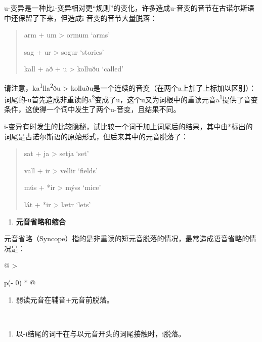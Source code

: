 u-变异是一种比i-变异相对更``规则''的变化，许多造成u-音变的音节在古诺尔斯语中还保留了下来，但造成i-音变的音节大量脱落：

\begin{quote}
arm + um \textgreater{} ormum `arms'

sag + ur \textgreater{} sogur `stories'

kall + að + u \textgreater{} kolluðu `called'
\end{quote}

请注意，ka\textsuperscript{1}lla\textsuperscript{2}ðu \textgreater{}
kolluðu是一个连续的音变（在两个a上加了上标加以区别）：词尾的-u首先造成非重读的a\textsuperscript{2}变成了u，这个u又为词根中的重读元音a\textsuperscript{1}提供了音变条件，这使得一个词中发生了两个u-音变，且结果不同。

i-变异有时发生的比较隐秘，试比较一个词干加上词尾后的结果，其中由*标出的词尾是古诺尔斯语的原始形式，但后来其中的元音脱落了：

\begin{quote}
sat + ja \textgreater{} setja `set'

vall + ir \textgreater{} vellir `fields'

mús + *ir \textgreater{} mýss `mice'

lát + *ir \textgreater{} lætr `lets'
\end{quote}

\begin{enumerate}
\def\labelenumi{\Alph{enumi}.}
\setcounter{enumi}{1}
\item
  \label{_Ref115693879}{}\textbf{元音省略和缩合}
\end{enumerate}

元音省略（Syncope）指的是非重读的短元音脱落的情况，最常造成语音省略的情况是：

\begin{longtable}[]{@{}
  >{\raggedright\arraybackslash}p{(\columnwidth - 0\tabcolsep) * }@{}}
\toprule\noalign{}
\begin{minipage}[b]{\linewidth}\raggedright
\begin{enumerate}
\def\labelenumi{\arabic{enumi}.}
\item
  \label{_Ref115694569}{}弱读元音在辅音+元音前脱落。
\end{enumerate}
\end{minipage} \\
\midrule\noalign{}
\endhead
\bottomrule\noalign{}
\endlastfoot
\begin{minipage}[t]{\linewidth}\raggedright
\begin{enumerate}
\def\labelenumi{\arabic{enumi}.}
\setcounter{enumi}{1}
\item
  \label{_Ref115709879}{}以-i结尾的词干在与以元音开头的词尾接触时，i脱落。
\end{enumerate}
\end{minipage} \\
\end{longtable}

